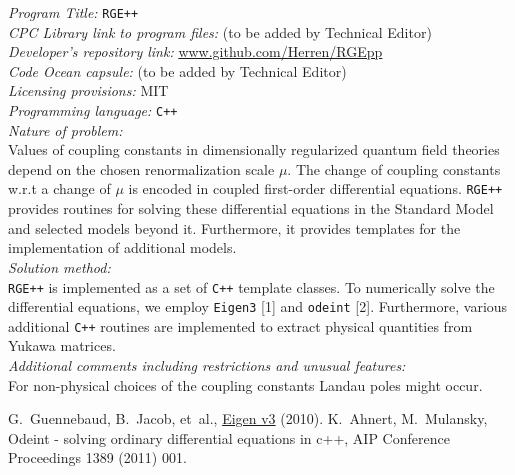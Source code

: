 \documentclass[preprint,12pt]{elsarticle}
\begin{document}
\begin{small}
\noindent
{\em Program Title:} \texttt{RGE++}                                       \\
{\em CPC Library link to program files:} (to be added by Technical Editor) \\
{\em Developer's repository link:} \href{www.github.com/Herren/RGEpp}{www.github.com/Herren/RGEpp} \\
{\em Code Ocean capsule:} (to be added by Technical Editor)\\
{\em Licensing provisions:} MIT  \\
{\em Programming language:} \texttt{C++}                           \\
{\em Nature of problem:}\\
Values of coupling constants in dimensionally regularized quantum field theories depend on the chosen renormalization scale $\mu$.
The change of coupling constants w.r.t a change of $\mu$ is encoded in coupled first-order differential equations. \texttt{RGE++} provides
routines for solving these differential equations in the Standard Model and selected models beyond it. Furthermore,
it provides templates for the implementation of additional models.\\
{\em Solution method:}\\
\texttt{RGE++} is implemented as a set of \texttt{C++} template classes. To numerically solve the differential equations, we employ \texttt{Eigen3} [1] and \texttt{odeint} [2].
Furthermore, various additional \texttt{C++} routines are implemented to extract physical quantities from Yukawa matrices.\\
{\em Additional comments including restrictions and unusual features:}\\
For non-physical choices of the coupling constants Landau poles might occur.


\begin{thebibliography}{0}
G.~Guennebaud, B.~Jacob, et~al., \href{http://eigen.tuxfamily.org}{Eigen v3} (2010).
K.~Ahnert, M.~Mulansky, Odeint - solving ordinary differential equations in
  c++, AIP Conference Proceedings 1389 (2011) 001.
\end{thebibliography}
\end{small}

\newpage

\setcounter{footnote}{0}
\end{document}
